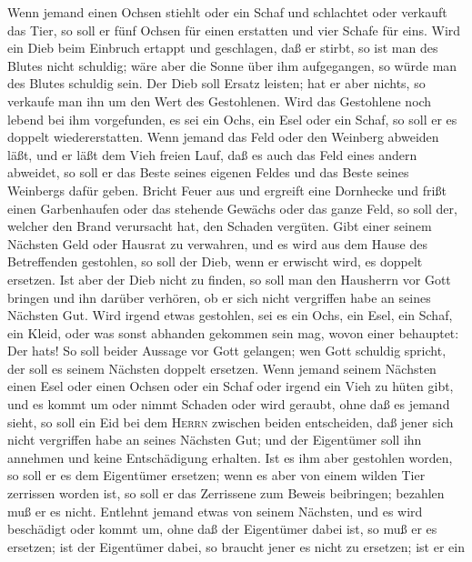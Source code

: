  Wenn jemand einen Ochsen stiehlt oder ein Schaf und
schlachtet oder verkauft das Tier, so soll er fünf Ochsen für einen
erstatten und vier Schafe für eins.  Wird ein Dieb beim
Einbruch ertappt und geschlagen, daß er stirbt, so ist man des Blutes
nicht schuldig;  wäre aber die Sonne über ihm aufgegangen,
so würde man des Blutes schuldig sein. Der Dieb soll Ersatz leisten; hat
er aber nichts, so verkaufe man ihn um den Wert des Gestohlenen.
 Wird das Gestohlene noch lebend bei ihm vorgefunden, es
sei ein Ochs, ein Esel oder ein Schaf, so soll er es doppelt
wiedererstatten.  Wenn jemand das Feld oder den Weinberg
abweiden läßt, und er läßt dem Vieh freien Lauf, daß es auch das Feld
eines andern abweidet, so soll er das Beste seines eigenen Feldes und
das Beste seines Weinbergs dafür geben.  Bricht Feuer aus
und ergreift eine Dornhecke und frißt einen Garbenhaufen oder das
stehende Gewächs oder das ganze Feld, so soll der, welcher den Brand
verursacht hat, den Schaden vergüten.  Gibt einer seinem
Nächsten Geld oder Hausrat zu verwahren, und es wird aus dem Hause des
Betreffenden gestohlen, so soll der Dieb, wenn er erwischt wird, es
doppelt ersetzen.  Ist aber der Dieb nicht zu finden, so
soll man den Hausherrn vor Gott bringen und ihn darüber verhören, ob er
sich nicht vergriffen habe an seines Nächsten Gut.  Wird
irgend etwas gestohlen, sei es ein Ochs, ein Esel, ein Schaf, ein Kleid,
oder was sonst abhanden gekommen sein mag, wovon einer behauptet: Der
hat\textquotesingle s! So soll beider Aussage vor Gott gelangen; wen
Gott schuldig spricht, der soll es seinem Nächsten doppelt ersetzen.
 Wenn jemand seinem Nächsten einen Esel oder einen Ochsen
oder ein Schaf oder irgend ein Vieh zu hüten gibt, und es kommt um oder
nimmt Schaden oder wird geraubt, ohne daß es jemand sieht,
 so soll ein Eid bei dem \textsc{Herrn} zwischen beiden
entscheiden, daß jener sich nicht vergriffen habe an seines Nächsten
Gut; und der Eigentümer soll ihn annehmen und keine Entschädigung
erhalten.  Ist es ihm aber gestohlen worden, so soll er
es dem Eigentümer ersetzen;  wenn es aber von einem
wilden Tier zerrissen worden ist, so soll er das Zerrissene zum Beweis
beibringen; bezahlen muß er es nicht.  Entlehnt jemand
etwas von seinem Nächsten, und es wird beschädigt oder kommt um, ohne
daß der Eigentümer dabei ist,  so muß er es ersetzen; ist
der Eigentümer dabei, so braucht jener es nicht zu ersetzen; ist er ein
